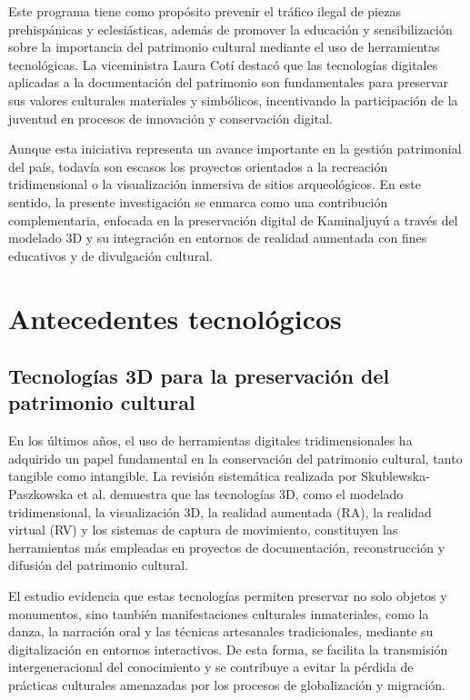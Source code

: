 Este programa tiene como propósito prevenir el tráfico ilegal de piezas prehispánicas y eclesiásticas, además de promover la educación y sensibilización sobre la importancia del patrimonio cultural mediante el uso de herramientas tecnológicas. La viceministra Laura Cotí destacó que las tecnologías digitales aplicadas a la documentación del patrimonio son fundamentales para preservar sus valores culturales materiales y simbólicos, incentivando la participación de la juventud en procesos de innovación y conservación digital.

Aunque esta iniciativa representa un avance importante en la gestión patrimonial del país, todavía son escasos los proyectos orientados a la recreación tridimensional o la visualización inmersiva de sitios arqueológicos. En este sentido, la presente investigación se enmarca como una contribución complementaria, enfocada en la preservación digital de Kaminaljuyú a través del modelado 3D y su integración en entornos de realidad aumentada con fines educativos y de divulgación cultural.

\section{Antecedentes tecnológicos}
\subsection{Tecnologías 3D para la preservación del patrimonio cultural}

En los últimos años, el uso de herramientas digitales tridimensionales ha adquirido un papel fundamental en la conservación del patrimonio cultural, tanto tangible como intangible. La revisión sistemática realizada por Skublewska-Paszkowska et al. \cite{Skublewska2022} demuestra que las tecnologías 3D, como el modelado tridimensional, la visualización 3D, la realidad aumentada (\gls{RA}), la realidad virtual (\gls{RV}) y los sistemas de captura de movimiento, constituyen las herramientas más empleadas en proyectos de documentación, reconstrucción y difusión del patrimonio cultural.

El estudio evidencia que estas tecnologías permiten preservar no solo objetos y monumentos, sino también manifestaciones culturales inmateriales, como la danza, la narración oral y las técnicas artesanales tradicionales, mediante su digitalización en entornos interactivos. De esta forma, se facilita la transmisión intergeneracional del conocimiento y se contribuye a evitar la pérdida de prácticas culturales amenazadas por los procesos de globalización y migración.

